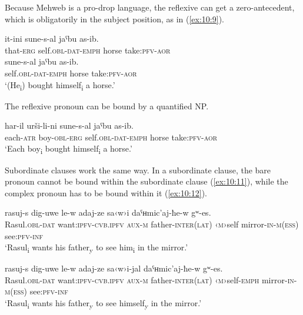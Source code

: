 ﻿\documentclass[output=paper]{langsci/langscibook}
\begin{document}
Because Mehweb is a pro-drop language, the reflexive can get a
zero-antecedent, which is obligatorily in the subject position, as in
(\ref{ex:10:9}).

\ea \label{ex:10:9} %
\ea %
\gll it-ini sune-s-al jaˤbu as-ib.\\
that-\textsc{erg} self.\textsc{obl}-\textsc{dat}-\textsc{emph} horse take:\textsc{pfv}-\textsc{aor}\\

\ex %
\gll sune-s-al jaˤbu as-ib.\\
self.\textsc{obl}-\textsc{dat}-\textsc{emph} horse take:\textsc{pfv}-\textsc{aor}\\ 
\glt `(He\textsubscript{i}) bought himself\textsubscript{i} a horse.'
\z
\z

The reflexive pronoun can be bound by a quantified NP.

\ea %
\gll  har-il urši-li-ni sune-s-al jaˤbu as-ib.\\
each-\textsc{atr} boy-\textsc{obl}-\textsc{erg} self.\textsc{obl}-\textsc{dat}-\textsc{emph} horse take:\textsc{pfv}-\textsc{aor}\\ 
\glt `Each boy\textsubscript{i} bought himself\textsubscript{i} a horse.'
\z

Subordinate clauses work the same way. In a subordinate clause, the bare
pronoun cannot be bound within the subordinate clause (\ref{ex:10:11}), while the
complex pronoun has to be bound within it (\ref{ex:10:12}).

\ea \label{ex:10:11} %
\gll  rasuj-s dig-uwe le-w adaj-ze sa‹w›i daˤʜmic'aj-ħe-w gʷ-es.\\
Rasul.\textsc{obl}-\textsc{dat} want:\textsc{ipfv}-\textsc{cvb.ipfv} \textsc{aux}-\textsc{m} father-\textsc{inter}(\textsc{lat}) ‹\textsc{m}›self mirror-\textsc{in}-\textsc{m}(\textsc{ess}) see:\textsc{pfv}-\textsc{inf}\\ 
\glt `Rasul\textsubscript{i} wants his father\textsubscript{y} to see
him\textsubscript{i} in the mirror.'

\ex \label{ex:10:12} %
\gll  rasuj-s dig-uwe le-w adaj-ze sa‹w›i-jal daˤʜmic'aj-ħe-w gʷ-es.\\
Rasul.\textsc{obl}-\textsc{dat} want:\textsc{ipfv}-\textsc{cvb.ipfv} \textsc{aux}-\textsc{m} father-\textsc{inter}(\textsc{lat}) ‹\textsc{m}›self-\textsc{emph} mirror-\textsc{in}-\textsc{m}(\textsc{ess}) see:\textsc{pfv}-\textsc{inf}\\ 
\glt `Rasul\textsubscript{i} wants his father\textsubscript{y} to see
himself\textsubscript{y} in the mirror.'
\z
\end{document}
